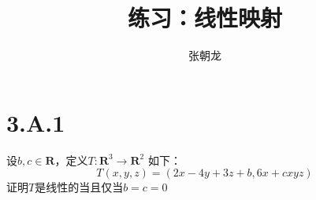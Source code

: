 \documentclass[10pt,a4paper,UTF8]{article}
\author{张朝龙}
\date{}
\title{练习：线性映射}
\begin{document}
\maketitle
\tableofcontents
{}

\section{3.A.1}
\label{sec:org64409a6}


\begin{problem}
设\(b,c\in  \mathbf{R}\)，定义\(T: \mathbf{R}^{3} \rightarrow \mathbf{R}^{2}\) 如下：
\[T(x,y,z) = (2x-4y+3z +b,6x+cxyz)\]
证明\(T\)是线性的当且仅当\(b=c=0\)
\end{problem}
\end{document}

